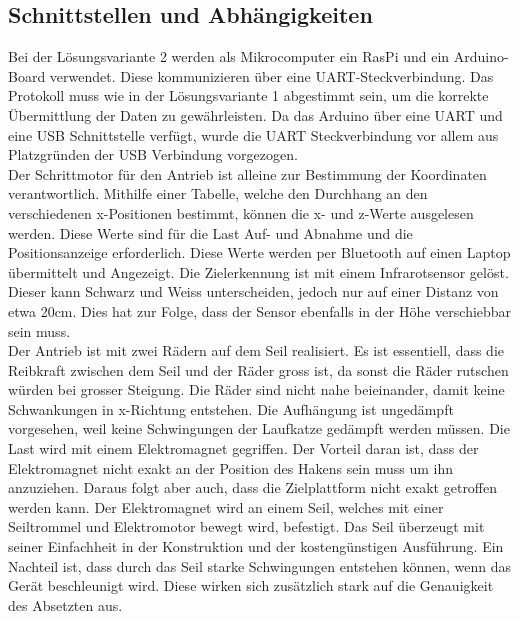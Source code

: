 \documentclass[a4paper]{report}
\begin{document}
\subsection{Schnittstellen und Abhängigkeiten}
Bei der Lösungsvariante 2 werden als Mikrocomputer ein RasPi und ein Arduino-Board verwendet. Diese kommunizieren über eine UART-Steckverbindung. Das Protokoll muss wie in der Lösungsvariante 1 abgestimmt sein, um die korrekte Übermittlung der Daten zu gewährleisten. Da das Arduino über eine UART und eine USB Schnittstelle verfügt, wurde die UART Steckverbindung vor allem aus Platzgründen der USB Verbindung vorgezogen.\\
Der Schrittmotor für den Antrieb ist alleine zur Bestimmung der Koordinaten verantwortlich. Mithilfe einer Tabelle, welche den Durchhang an den verschiedenen x-Positionen bestimmt, können die x- und z-Werte ausgelesen werden. Diese Werte sind für die Last Auf- und Abnahme und die Positionsanzeige erforderlich. Diese Werte werden per Bluetooth auf einen Laptop übermittelt und Angezeigt. Die Zielerkennung ist mit einem Infrarotsensor gelöst. Dieser kann Schwarz und Weiss unterscheiden, jedoch nur auf einer Distanz von etwa 20cm. Dies hat zur Folge, dass der Sensor ebenfalls in der Höhe verschiebbar sein muss.\\
Der Antrieb ist mit zwei Rädern auf dem Seil realisiert. Es ist essentiell, dass die Reibkraft zwischen dem Seil und der Räder gross ist, da sonst die Räder rutschen würden bei grosser Steigung. Die Räder sind nicht nahe beieinander, damit keine Schwankungen in x-Richtung entstehen. Die Aufhängung ist ungedämpft vorgesehen, weil keine Schwingungen der Laufkatze gedämpft werden müssen.
Die Last wird mit einem Elektromagnet gegriffen. Der Vorteil daran ist, dass der Elektromagnet nicht exakt an der Position des Hakens sein muss um ihn anzuziehen. Daraus folgt aber auch, dass die Zielplattform nicht exakt getroffen werden kann. Der Elektromagnet wird an einem Seil, welches mit einer Seiltrommel und Elektromotor bewegt wird, befestigt. Das Seil überzeugt mit seiner Einfachheit in der Konstruktion und der kostengünstigen Ausführung. Ein Nachteil ist, dass durch das Seil starke Schwingungen entstehen können, wenn das Gerät beschleunigt wird. Diese wirken sich zusätzlich stark auf die Genauigkeit des Absetzten aus.
\end{document}
